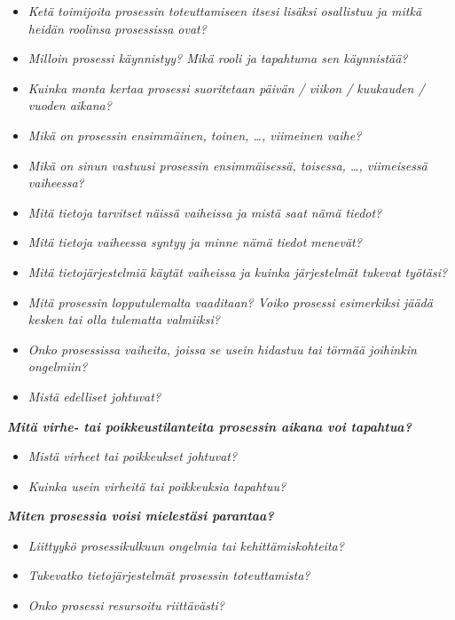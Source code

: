 \documentclass[
  finnish,
  letterpaper,
  DIV=11,
  numbers=noendperiod,
  oneside]{scrreprt}
\providecommand{\tightlist}{%
  \setlength{\itemsep}{0pt}\setlength{\parskip}{0pt}}
\begin{document}
\begin{itemize}
\tightlist
\item
  \emph{Ketä toimijoita prosessin toteuttamiseen itsesi lisäksi
  osallistuu ja mitkä heidän roolinsa prosessissa ovat?}
\item
  \emph{Milloin prosessi käynnistyy? Mikä rooli ja tapahtuma sen
  käynnistää?}
\item
  \emph{Kuinka monta kertaa prosessi suoritetaan päivän / viikon /
  kuukauden / vuoden aikana?}
\item
  \emph{Mikä on prosessin ensimmäinen, toinen, \ldots, viimeinen
  vaihe}\emph{?}
\item
  \emph{Mikä on sinun vastuusi prosessin ensimmäisessä, toisessa,
  \ldots, viimeisessä vaiheessa?}
\item
  \emph{Mitä tietoja tarvitset näissä vaiheissa ja mistä saat nämä
  tiedot?}
\item
  \emph{Mitä tietoja vaiheessa syntyy ja minne nämä tiedot menevät?}
\item
  \emph{Mitä tietojärjestelmiä käytät vaiheissa ja kuinka järjestelmät
  tukevat työtäsi?}
\item
  \emph{Mitä prosessin lopputulemalta vaaditaan? Voiko prosessi
  esimerkiksi jäädä kesken tai olla tulematta valmiiksi?}
\item
  \emph{Onko prosessissa vaiheita, joissa se usein hidastuu tai törmää
  joihinkin ongelmiin?}
\item
  \emph{Mistä edelliset johtuvat?}
\end{itemize}

\textbf{\emph{Mitä virhe- tai poikkeustilanteita prosessin aikana voi
tapahtua?}}

\begin{itemize}
\tightlist
\item
  \emph{Mistä virheet tai poikkeukset johtuvat?}
\item
  \emph{Kuinka usein virheitä tai poikkeuksia tapahtuu?}
\end{itemize}

\textbf{\emph{Miten prosessia voisi mielestäsi parantaa?}}

\begin{itemize}
\tightlist
\item
  \emph{Liittyykö prosessikulkuun ongelmia tai kehittämiskohteita?}
\item
  \emph{Tukevatko tietojärjestelmät prosessin toteuttamista?}
\item
  \emph{Onko prosessi resursoitu riittävästi?}
\end{itemize}
\end{document}
